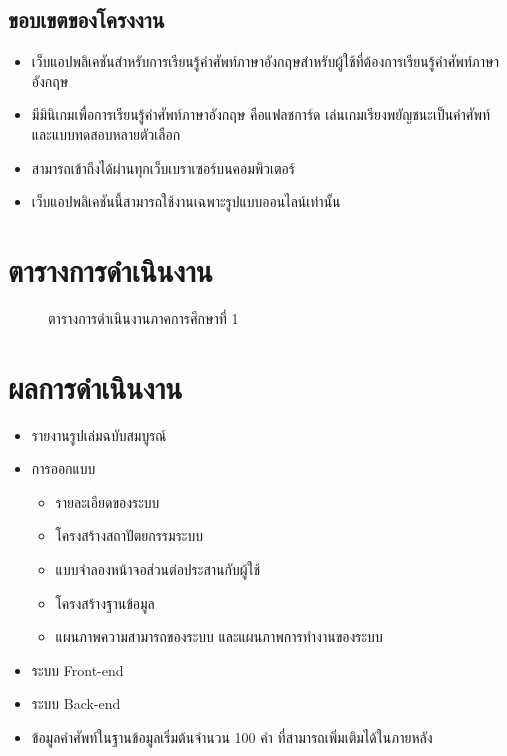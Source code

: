 \documentclass[12pt,oneside,openright,a4paper]{cpe-thai-project}
\begin{document}
\subsection{ขอบเขตของโครงงาน}

\begin{itemize}
	\item  เว็บแอปพลิเคชันสำหรับการเรียนรู้คำศัพท์ภาษาอังกฤษสำหรับผู้ใช้ที่ต้องการเรียนรู้คำศัพท์ภาษาอังกฤษ
	\item  มีมินิเกมเพื่อการเรียนรู้คำศัพท์ภาษาอังกฤษ คือแฟลชการ์ด เล่นเกมเรียงพยัญชนะเป็นคำศัพท์ และแบบทดสอบหลายตัวเลือก
	\item  สามารถเข้าถึงได้ผ่านทุกเว็บเบราเซอร์บนคอมพิวเตอร์
	\item  เว็บแอปพลิเคชันนี้สามารถใช้งานเฉพาะรูปแบบออนไลน์เท่านั้น
\end{itemize}

\section{ตารางการดำเนินงาน}

\begin{figure}[!h]\centering
	\caption{ตารางการดำเนินงานภาคการศึกษาที่ 1}\label{fig:plan}
\end{figure}

\section{ผลการดำเนินงาน}

\begin{itemize}
	\item รายงานรูปเล่มฉบับสมบูรณ์
	\item การออกแบบ
	      \begin{itemize}
		      \item รายละเอียดของระบบ
		      \item โครงสร้างสถาปัตยกรรมระบบ
		      \item แบบจำลองหน้าจอส่วนต่อประสานกับผู้ใช้
		      \item โครงสร้างฐานข้อมูล
		      \item แผนภาพความสามารถของระบบ และแผนภาพการทำงานของระบบ
	      \end{itemize}
	\item ระบบ Front-end
	\item ระบบ Back-end
	\item ข้อมูลคำศัพท์ในฐานข้อมูลเริ่มต้นจำนวน 100 คำ ที่สามารถเพิ่มเติมได้ในภายหลัง
\end{itemize}
\end{document}
